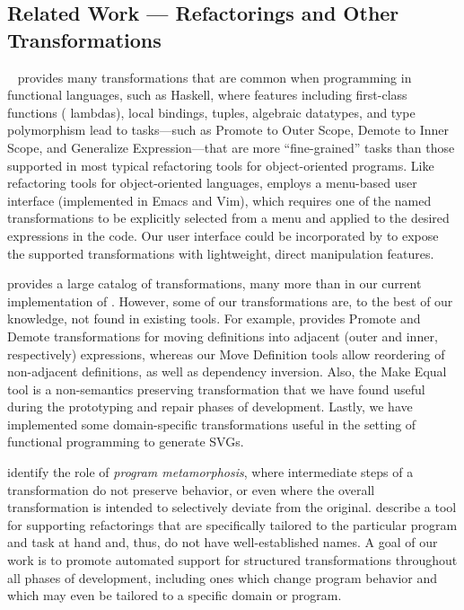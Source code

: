 \subsection{Related Work --- Refactorings and Other Transformations}


\hare{}~\cite{Thompson2013,HaReThesis1,HaReThesis2}
provides many transformations that are common when programming in
functional languages, such as Haskell,
where features including first-class functions
(\ie{} lambdas), local bindings, tuples, algebraic datatypes, and type
polymorphism lead to tasks---such as Promote to Outer Scope, Demote to
Inner Scope, and Generalize Expression---that are more
``fine-grained'' tasks than those supported in most typical
refactoring tools for object-oriented programs. Like refactoring tools
for object-oriented languages, \hare{} employs a menu-based user
interface (implemented in Emacs and Vim), which requires one of the named
transformations to be explicitly selected from a menu
and applied to the desired expressions in the code.
Our user interface could be incorporated by \hare{} to expose the
supported transformations with lightweight, direct manipulation
features.


\hare{} provides a large catalog of transformations, many more than in
our current implementation of \deuce{}. However, some of our
transformations are, to the best of our knowledge, not found in
existing tools. For example, \hare{} provides Promote and Demote
transformations for moving definitions into adjacent (outer and inner,
respectively) expressions, whereas our Move Definition tools allow
reordering of non-adjacent definitions, as well as dependency inversion.
Also, the Make Equal tool is a non-semantics preserving transformation
that we have found useful during the prototyping and repair phases of
development. Lastly, we have implemented some domain-specific
transformations useful in the setting of functional programming to
generate SVGs.


\citet{Reichenbach:2009}
identify the role of \emph{program metamorphosis}, where intermediate
steps of a transformation do not preserve behavior, or even
where the overall transformation is intended to selectively deviate
from the original. \citet{Steimann:2012} describe a tool for
supporting refactorings that are specifically tailored to the
particular program and task at hand and, thus, do not have
well-established names.
A goal of our work is to promote automated support for structured
transformations throughout all phases of development, including ones
which change program behavior and which may even be tailored to a
specific domain or program.

